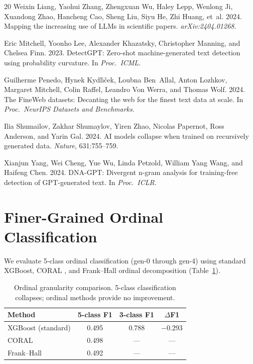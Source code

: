 \documentclass[11pt,a4paper]{article}
\begin{document}
\begin{thebibliography}{20}
Weixin Liang, Yaohui Zhang, Zhengxuan Wu, Haley Lepp, Wenlong Ji, Xuandong Zhao, Hancheng Cao, Sheng Liu, Siyu He, Zhi Huang, et~al. 2024.
\newblock Mapping the increasing use of LLMs in scientific papers.
\newblock \emph{arXiv:2404.01268}.

Eric Mitchell, Yoonho Lee, Alexander Khazatsky, Christopher Manning, and Chelsea Finn. 2023.
\newblock DetectGPT: Zero-shot machine-generated text detection using probability curvature.
\newblock In \emph{Proc.\ ICML}.

Guilherme Penedo, Hynek Kydl{\'\i}{\v{c}}ek, Loubna Ben~Allal, Anton Lozhkov, Margaret Mitchell, Colin Raffel, Leandro Von Werra, and Thomas Wolf. 2024.
\newblock The FineWeb datasets: Decanting the web for the finest text data at scale.
\newblock In \emph{Proc.\ NeurIPS Datasets and Benchmarks}.

Ilia Shumailov, Zakhar Shumaylov, Yiren Zhao, Nicolas Papernot, Ross Anderson, and Yarin Gal. 2024.
\newblock AI models collapse when trained on recursively generated data.
\newblock \emph{Nature}, 631:755--759.

Xianjun Yang, Wei Cheng, Yue Wu, Linda Petzold, William Yang Wang, and Haifeng Chen. 2024.
\newblock DNA-GPT: Divergent n-gram analysis for training-free detection of GPT-generated text.
\newblock In \emph{Proc.\ ICLR}.

\end{thebibliography}

\clearpage
\appendix

\section{Finer-Grained Ordinal Classification}
\label{app:ordinal}

We evaluate 5-class ordinal classification (gen-0 through gen-4) using standard XGBoost, CORAL \cite{cao2020rank}, and Frank--Hall ordinal decomposition (Table~\ref{tab:ordinal}).

\begin{table}[h]
\centering
\small
\caption{Ordinal granularity comparison. 5-class classification collapses; ordinal methods provide no improvement.}
\label{tab:ordinal}
\begin{tabular}{lccc}
\toprule
\textbf{Method} & \textbf{5-class F1} & \textbf{3-class F1} & \textbf{$\Delta$F1} \\
\midrule
XGBoost (standard) & 0.495 & 0.788 & $-$0.293 \\
CORAL & 0.498 & --- & --- \\
Frank--Hall & 0.492 & --- & --- \\
\bottomrule
\end{tabular}
\end{table}
\end{document}

